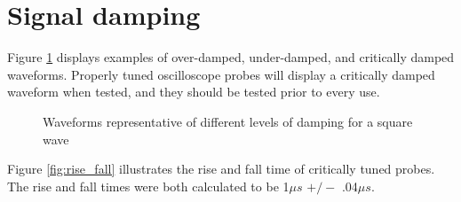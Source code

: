 \documentclass[11pt]{article}
\begin{document}
\section{Signal damping}

Figure \ref{fig:damping} displays examples of over-damped, under-damped, and critically damped waveforms. Properly tuned oscilloscope probes will display a critically damped waveform when tested, and they should be tested prior to every use.

\begin{figure}
	\centering
	\caption{Waveforms representative of different levels of damping for a square wave}
	\label{fig:damping}
\end{figure}

Figure \ref{fig:rise_fall} illustrates the rise and fall time of critically tuned probes.  The rise and fall times were both calculated to be 1${\mu}s$ $+/-$ .04${\mu}s$.
\end{document}
